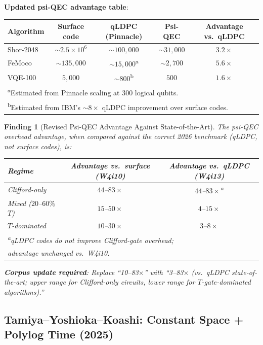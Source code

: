 \documentclass[11pt]{article}
\newtheorem{finding}[theorem]{Finding}
\theoremstyle{definition}
\theoremstyle{remark}
\newcommand{\ee}[1]{\times 10^{#1}}
\begin{document}
\textbf{Updated psi-QEC advantage table}:

\begin{center}
\begin{tabular}{@{}lcccc@{}}
\toprule
Algorithm & Surface code & qLDPC (Pinnacle) & Psi-QEC & Advantage vs.\ qLDPC \\
\midrule
Shor-2048 & $\sim 2.5\ee{6}$ & $\sim 100{,}000$ & $\sim 31{,}000$ & $3.2\times$ \\
FeMoco & $\sim 135{,}000$ & $\sim 15{,}000$\textsuperscript{a} & $\sim 2{,}700$ & $5.6\times$ \\
VQE-100 & $5{,}000$ & $\sim 800$\textsuperscript{b} & $500$ & $1.6\times$ \\
\bottomrule
\multicolumn{5}{l}{\textsuperscript{a}Estimated from Pinnacle scaling at 300 logical qubits.} \\
\multicolumn{5}{l}{\textsuperscript{b}Estimated from IBM's $\sim 8\times$ qLDPC improvement over surface codes.}
\end{tabular}
\end{center}

\begin{finding}[Revised Psi-QEC Advantage Against State-of-the-Art]
\label{finding:revised-advantage}
The psi-QEC overhead advantage, when compared against the correct
2026 benchmark (qLDPC, not surface codes), is:
\begin{center}
\begin{tabular}{@{}lcc@{}}
\toprule
Regime & Advantage vs.\ surface (W4i10) & Advantage vs.\ qLDPC (W4i13) \\
\midrule
Clifford-only & $44$--$83\times$ & $44$--$83\times$\textsuperscript{a} \\
Mixed ($20$--$60\%$ $T$) & $15$--$50\times$ & $4$--$15\times$ \\
$T$-dominated & $10$--$30\times$ & $3$--$8\times$ \\
\bottomrule
\multicolumn{3}{l}{\textsuperscript{a}qLDPC codes do not improve Clifford-gate overhead;} \\
\multicolumn{3}{l}{\phantom{\textsuperscript{a}}advantage unchanged vs.\ W4i10.}
\end{tabular}
\end{center}
\textbf{Corpus update required}: Replace ``10--83$\times$'' with
``3--83$\times$ (vs.\ qLDPC state-of-the-art; upper range for Clifford-only
circuits, lower range for $T$-gate-dominated algorithms).''
\end{finding}

\subsection{Tamiya--Yoshioka--Koashi: Constant Space + Polylog Time (2025)}
\label{sec:tamiya}
\end{document}
